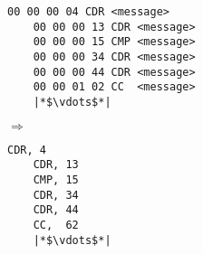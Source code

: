 
\begin{center}
    \captionsetup{width=0.45\columnwidth}
    \begin{minipage}{.6\columnwidth}
        \begin{lstlisting}[style=transcript]
    00 00 00 04 CDR <message>
    00 00 00 13 CDR <message>
    00 00 00 15 CMP <message>
    00 00 00 34 CDR <message>
    00 00 00 44 CDR <message>
    00 00 01 02 CC  <message>
    |*$\vdots$*|
        \end{lstlisting}
    \end{minipage}$\Longrightarrow$
    \begin{minipage}{.25\columnwidth}
        \begin{lstlisting}[style=transcript]
    CDR, 4
    CDR, 13
    CMP, 15
    CDR, 34
    CDR, 44
    CC,  62
    |*$\vdots$*|
        \end{lstlisting}
    \end{minipage}
\end{center}
\vspace{-1em}
\vspace{1em}
\label{lstlisting:transcript}